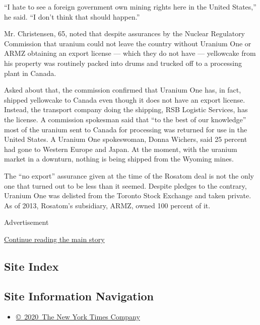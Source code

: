 ``I hate to see a foreign government own mining rights here in the
United States,'' he said. ``I don't think that should happen.''

Mr. Christensen, 65, noted that despite assurances by the Nuclear
Regulatory Commission that uranium could not leave the country without
Uranium One or ARMZ obtaining an export license --- which they do not
have --- yellowcake from his property was routinely packed into drums
and trucked off to a processing plant in Canada.

Asked about that, the commission confirmed that Uranium One has, in
fact, shipped yellowcake to Canada even though it does not have an
export license. Instead, the transport company doing the shipping, RSB
Logistic Services, has the license. A commission spokesman said that
``to the best of our knowledge'' most of the uranium sent to Canada for
processing was returned for use in the United States. A Uranium One
spokeswoman, Donna Wichers, said 25 percent had gone to Western Europe
and Japan. At the moment, with the uranium market in a downturn, nothing
is being shipped from the Wyoming mines.

The ``no export'' assurance given at the time of the Rosatom deal is not
the only one that turned out to be less than it seemed. Despite pledges
to the contrary, Uranium One was delisted from the Toronto Stock
Exchange and taken private. As of 2013, Rosatom's subsidiary, ARMZ,
owned 100 percent of it.

Advertisement

\protect\hyperlink{after-bottom}{Continue reading the main story}

\hypertarget{site-index}{%
\subsection{Site Index}\label{site-index}}

\hypertarget{site-information-navigation}{%
\subsection{Site Information
Navigation}\label{site-information-navigation}}

\begin{itemize}
\tightlist
\item
  \href{https://help.nytimes.com/hc/en-us/articles/115014792127-Copyright-notice}{©~2020~The
  New York Times Company}
\end{itemize}

